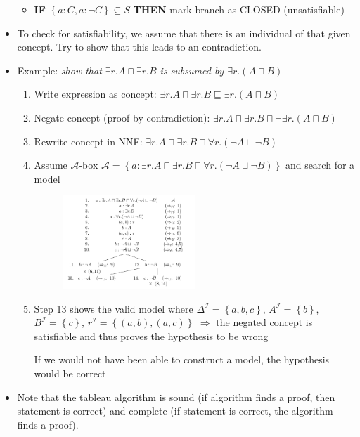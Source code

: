 \begin{itemize}
\begin{itemize}
		\item \textbf{IF} $\left\{a:C, a:\lnot C\right\}\subseteq S$ \textbf{THEN} mark branch as CLOSED (unsatisfiable)
	\end{itemize}
	\item To check for satisfiability, we assume that there is an individual of that given concept. Try to show that this leads to an contradiction.
	\item Example: \textit{show that $\exists r.A \sqcap \exists r.B$ is subsumed by $\exists r.(A\sqcap B)$}
	\begin{enumerate}
		\item Write expression as concept: $\exists r.A \sqcap \exists r.B \sqsubseteq \exists r.(A\sqcap B)$
		\item Negate concept (proof by contradiction): $\exists r.A \sqcap \exists r.B \sqcap \lnot \exists r.(A\sqcap B)$
		\item Rewrite concept in NNF: $\exists r.A \sqcap \exists r.B \sqcap \forall r.(\lnot A\sqcup \lnot B)$
		\item Assume $\mathcal{A}$-box $\mathcal{A}=\left\{a: \exists r.A \sqcap \exists r.B \sqcap \forall r.(\lnot A\sqcup \lnot B)\right\}$ and search for a model
%			
		\begin{figure}[ht!]
			\hspace{30mm}
			\includegraphics[width=0.5\textwidth]{figures/kr_dl_tableau_proof_example.png}
		\end{figure}
		\item Step 13 shows the valid model where $\Delta^{\mathcal{I}}=\left\{a,b,c\right\}$, $A^{\mathcal{I}}=\left\{b\right\}$, $B^{\mathcal{I}}=\left\{c\right\}$, $r^{\mathcal{I}}=\left\{(a,b), (a,c)\right\}$ $\Rightarrow$ the negated concept is satisfiable and thus proves the hypothesis to be wrong
		
		If we would not have been able to construct a model, the hypothesis would be correct 
	\end{enumerate}
	\item Note that the tableau algorithm is sound (if algorithm finds a proof, then statement is correct) and complete (if statement is correct, the algorithm finds a proof).
\end{itemize}
